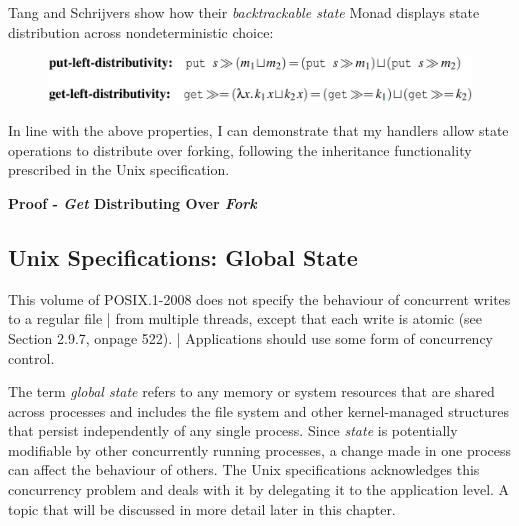 \documentclass[logo,bsc,singlespacing,parskip]{infthesis}
\begin{document}
Tang and Schrijvers \cite{tang2025high} show how their \textit{backtrackable state} Monad displays state distribution across nondeterministic choice:


\begin{figure}[H]  %
  \centering
  \includegraphics[width=1\textwidth]{distributivity.png}  %
  
\end{figure}

In line with the above properties, I can demonstrate that my handlers allow state operations to distribute over forking, following the inheritance functionality prescribed in the Unix specification. 


{\large{\textbf{Proof - \textit{Get} Distributing Over \textit{Fork}}}}







\subsection{Unix Specifications: Global State }

\begin{tcolorbox}[colback=gray!10, colframe=gray!60, sharp corners, boxrule=0.5pt, title={POSIX Base Specifications, Issue 7, p.2316}]
 This volume of POSIX.1-2008 does not specify the behaviour of concurrent writes to a regular file |
 from multiple threads, except that each write is atomic (see Section 2.9.7, onpage 522). |
 Applications should use some form of concurrency control.
\end{tcolorbox}

The term \textit{global state} refers to any memory or system resources that are shared across processes and includes the file system and other kernel-managed structures that persist independently of any single process. Since \textit{state} is potentially modifiable by other concurrently running processes, a change made in one process can affect the behaviour of others. The Unix specifications acknowledges this concurrency problem and deals with it by delegating it to the application level. A topic that will be discussed in more detail later in this chapter.
\end{document}
